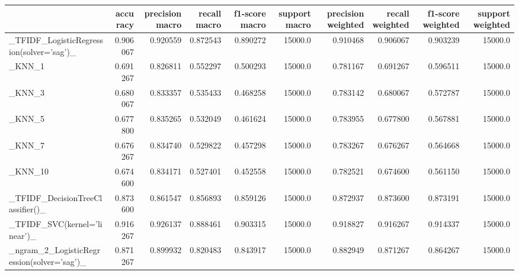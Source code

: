 \begin{tabular}{lrrrrrrrrr}
\toprule
{} &  accuracy &  precision macro &  recall macro &  f1-score macro &  support macro &  precision weighted &  recall weighted &  f1-score weighted &  support weighted \\
\midrule
\_TFIDF\_LogisticRegression(solver='sag')\_           &  0.906067 &         0.920559 &      0.872543 &        0.890272 &        15000.0 &            0.910468 &         0.906067 &           0.903239 &           15000.0 \\
\_KNN\_1                                             &  0.691267 &         0.826811 &      0.552297 &        0.500293 &        15000.0 &            0.781167 &         0.691267 &           0.596511 &           15000.0 \\
\_KNN\_3                                             &  0.680067 &         0.833357 &      0.535433 &        0.468258 &        15000.0 &            0.783142 &         0.680067 &           0.572787 &           15000.0 \\
\_KNN\_5                                             &  0.677800 &         0.835265 &      0.532049 &        0.461624 &        15000.0 &            0.783955 &         0.677800 &           0.567881 &           15000.0 \\
\_KNN\_7                                             &  0.676267 &         0.834740 &      0.529822 &        0.457298 &        15000.0 &            0.783267 &         0.676267 &           0.564668 &           15000.0 \\
\_KNN\_10                                            &  0.674600 &         0.834171 &      0.527401 &        0.452558 &        15000.0 &            0.782521 &         0.674600 &           0.561150 &           15000.0 \\
\_TFIDF\_DecisionTreeClassifier()\_                   &  0.873600 &         0.861547 &      0.856893 &        0.859126 &        15000.0 &            0.872937 &         0.873600 &           0.873191 &           15000.0 \\
\_TFIDF\_SVC(kernel='linear')\_                       &  0.916267 &         0.926137 &      0.888461 &        0.903315 &        15000.0 &            0.918827 &         0.916267 &           0.914337 &           15000.0 \\
\_ngram\_2\_LogisticRegression(solver='sag')\_         &  0.871267 &         0.899932 &      0.820483 &        0.843917 &        15000.0 &            0.882949 &         0.871267 &           0.864267 &           15000.0 \\

\end{tabular}
